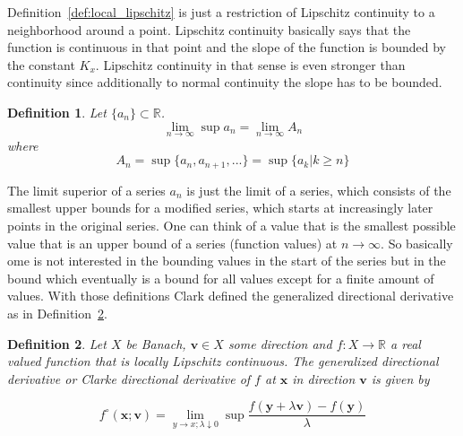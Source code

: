 \documentclass[a4paper,10pt]{article}
\newtheorem{definition}{Definition}
\renewcommand{\vec}[1]{\mathbf{#1}}
\newcommand{\defref}[1]{Definition~\ref{#1}}
\begin{document}
    \defref{def:local_lipschitz} is just a restriction of Lipschitz continuity
    to a neighborhood around a point.
    Lipschitz continuity basically says that the function is continuous in
    that point and the slope of the function is bounded by the constant $K_x$.     
    Lipschitz continuity in that sense is even stronger than continuity
    since additionally to normal continuity the slope has to be bounded.

    \begin{definition}
        Let $\{a_n\} \subset \mathbb{R}$.
        \begin{equation}
            \lim_{n \rightarrow \infty} \sup a_n = \lim_{n \rightarrow \infty} A_n
        \end{equation} 
        where
        \begin{equation}
            A_n = \sup\{a_n, a_{n+1}, ...\} = \sup\{a_k | k \geq n\}
        \end{equation}
    \end{definition}

    The limit superior of a series $a_n$ is just the limit of a series, which consists
    of the smallest upper bounds for a modified series, which
    starts at increasingly later points in the original series.
    One can think of a value that is the smallest possible value that is
    an upper bound of a series (function values) at $n \rightarrow \infty$.
    So basically ome is not interested in the bounding values in the start
    of the series but in the bound which eventually is a bound for all
    values except for a finite amount of values. 
    With those definitions Clark defined the generalized directional
    derivative as in \defref{def:generalized_deriv}.

    \begin{definition}
        \label{def:generalized_deriv}
        Let $X$ be Banach, $\vec{v} \in X$ some direction and 
        $f : X \rightarrow \mathbb{R}$ a real valued
        function that is locally Lipschitz continuous.
        The generalized directional derivative or Clarke directional
        derivative of $f$ at $\vec{x}$ in direction $\vec{v}$ is given by

        \begin{equation}
            f^{\circ}(\vec{x};\vec{v}) = 
            \lim_{y \rightarrow x; \lambda \downarrow 0} \sup
             \frac{f(\vec{y} + \lambda \vec{v}) - f(\vec{y})}{\lambda}
        \end{equation}

    \end{definition}
\end{document}
